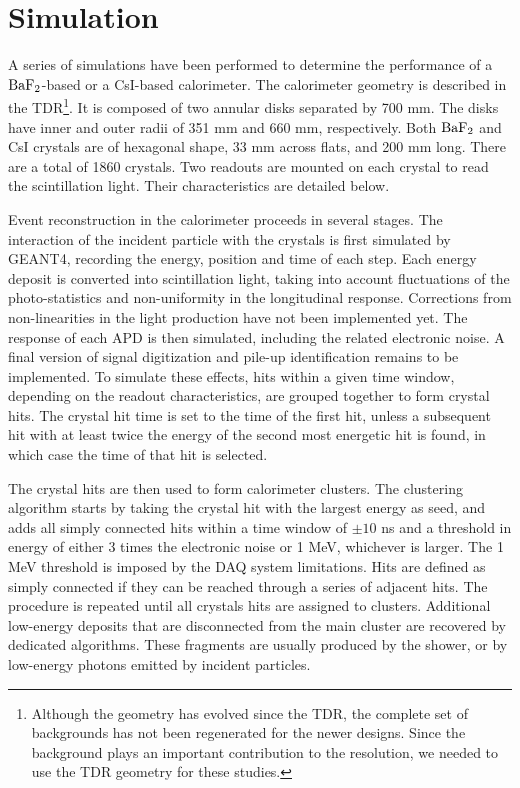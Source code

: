 \section{Simulation}A series of simulations have been performed to determine the performance of a  $\rm BaF_2$-based or a CsI-based 
calorimeter. The calorimeter geometry is described in the TDR\footnote{Although the geometry has evolved since 
the TDR, the complete set of backgrounds has not been regenerated for the newer designs. Since the background plays 
an important contribution to the resolution, we needed to use the TDR geometry for these studies.}. It is composed 
of two annular disks separated by 700 mm. The disks have inner and outer radii of 351 mm and 660 mm, respectively. 
Both $\rm BaF_2$ and CsI crystals are of hexagonal shape, 33 mm across flats, and 200 mm long. There are a total 
of 1860 crystals. Two readouts are mounted on each crystal to read the scintillation light. Their characteristics 
are detailed below.

Event reconstruction in the calorimeter proceeds in several stages. The interaction of the incident particle with the crystals 
is first simulated by GEANT4, recording the energy, position and time of each step. Each energy deposit is converted into 
scintillation light, taking into account fluctuations of the photo-statistics and non-uniformity in the longitudinal response. 
Corrections from non-linearities in the light production have not been implemented yet. The response of each APD is then simulated, 
including the related electronic noise. A final version of signal digitization and pile-up identification remains to be implemented. 
To simulate these effects, hits within a given time window, depending on the readout characteristics, are grouped together to form 
crystal hits. The crystal hit time is set to the time of the first hit, unless a subsequent hit with at least twice the energy of the 
second most energetic hit is found, in which case the time of that hit is selected.

The crystal hits are then used to form calorimeter clusters. The clustering algorithm starts by taking the crystal hit with the 
largest energy as seed, and adds all simply connected hits within a time window of $\pm 10$ ns and a threshold in energy of either 
3 times the electronic noise or 1 MeV, whichever is larger. The 1 MeV threshold is imposed by the DAQ system limitations. Hits are 
defined as simply connected if they can be reached through a series of adjacent hits. The procedure is repeated until all crystals 
hits are assigned to clusters. Additional low-energy deposits that are disconnected from the main cluster are recovered by dedicated 
algorithms. These fragments are usually produced by the shower, or by low-energy photons emitted by incident particles. 

